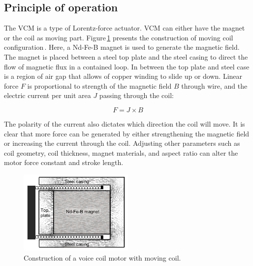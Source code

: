     
    \subsection{Principle of operation}             \label{Chapter:background/voice coil motors for NFJI/principle}


    The \ac{VCM} is a type of Lorentz-force actuator. \ac{VCM} can either have the magnet or the coil as moving part. Figure\,\ref{fig:chapter/background/vcm cut view} presents the construction of moving coil configuration\,\cite{taberner2006}. Here, a Nd-Fe-B magnet is used to generate the magnetic field. The magnet is placed between a steel top plate and the steel casing to direct the flow of magnetic flux in a contained loop. In between the top plate and steel case is a region of air gap that allows of copper winding to slide up or down. Linear force $F$ is proportional to strength of the magnetic field $B$ through wire, and the electric current per unit area $J$ passing through the coil:
    
    
    \begin{equation}
        F=J\times B
        \label{eq:force produce via field and current}
    \end{equation}

    The polarity of the current also dictates which direction the coil will move. It is clear that more force can be generated by either strengthening the magnetic field or increasing the current through the coil. Adjusting other parameters such as coil geometry, coil thickness, magnet materials, and aspect ratio can alter the motor force constant and stroke length.
    
    
    \begin{figure}[!ht]
      \centering
      \includegraphics[width=0.5\textwidth]{chap2/images/vcm_cut_view.png}
      \caption{Construction of a voice coil motor with moving coil.}
      \label{fig:chapter/background/vcm cut view}
    \end{figure}
    
